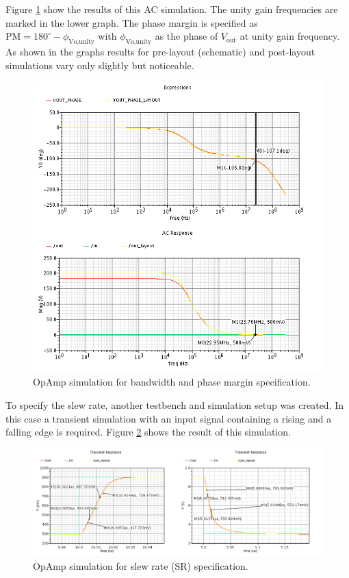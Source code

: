 \documentclass[parskip,oneside,colorbacktitle,10pt,accentcolor=tud1b,table]{tudreport}
\begin{document}
{Figure \ref{fig:opamp_pm} show the results of this AC simulation. The unity gain frequencies are marked in the lower graph. The phase margin is specified as $\text{PM} = 180^\circ - \phi_\text{Vo,unity}$ with $\phi_\text{Vo,unity}$ as the phase of $V_\text{out}$ at unity gain frequency. As shown in the graphs results for pre-layout (schematic) and post-layout simulations vary only slightly but noticeable.

\begin{figure}[H]
	\begin{center}
		\includegraphics[scale=0.60]{opamp_pm}
	    \caption{OpAmp simulation for bandwidth and phase margin specification.}
	    \label{fig:opamp_pm}		
	\end{center}
\end{figure}

To specify the slew rate, another testbench and simulation setup was created. In this case a transient simulation with an input signal containing a rising and a falling edge is required. Figure \ref{fig:opamp_sr} shows the result of this simulation. 

\begin{figure}[H]
	\begin{center}
		\includegraphics[width=\linewidth]{opamp_sr}
	    \caption{OpAmp simulation for slew rate (SR) specification.}
	    \label{fig:opamp_sr}
	\end{center}
\end{figure}

}
\end{document}
